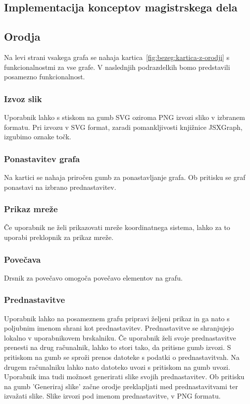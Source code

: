\documentclass[isrm2, tisk]{fmfdelo}
\begin{document}
    \subsection{Implementacija konceptov magistrskega dela}

    \subsection{Orodja}
    Na levi strani vsakega grafa se nahaja kartica~\ref{fig:bezeg:kartica-z-orodji} s funkcionalnostmi za vse grafe.
    V naslednjih podrazdelkih bomo predstavili posamezno funkcionalnost.

    \subsubsection{Izvoz slik}
    Uporabnik lahko s stiskom na gumb SVG oziroma PNG izvozi sliko v izbranem formatu.
    Pri izvozu v SVG format, zaradi pomankljivosti knjižnice JSXGraph, izgubimo oznake točk.

    \subsubsection{Ponastavitev grafa}
    Na kartici se nahaja priročen gumb za ponastavljanje grafa.
    Ob pritisku se graf ponastavi na izbrano prednastavitev.

    \subsubsection{Prikaz mreže}
    Če uporabnik ne želi prikazovati mreže koordinatnega sistema, lahko za to uporabi preklopnik za prikaz mreže.

    \subsubsection{Povečava}
    Drsnik za povečavo omogoča povečavo elementov na grafu.

    \subsubsection{Prednastavitve}
    Uporabnik lahko na posameznem grafu pripravi željeni prikaz in ga nato s poljubnim imenom shrani kot prednastavitev.
    Prednastavitve se shranjujejo lokalno v uporabnikovem brskalniku.
    Če uporabnik želi svoje prednastavitve prenesti na drug računalnik, lahko to stori tako, da pritisne gumb izvozi.
    S pritiskom na gumb se sproži prenos datoteke s podatki o prednastavitvah.
    Na drugem računalniku lahko nato datoteko uvozi s pritiskom na gumb uvozi.
    Uporabnik ima tudi možnost generirati slike svojih prednastavitev.
    Ob pritisku na gumb 'Generiraj slike' začne orodje preklapljati med prednastavitvami ter izvažati slike.
    Slike izvozi pod imenom prednastavitve, v PNG formatu.
\end{document}
